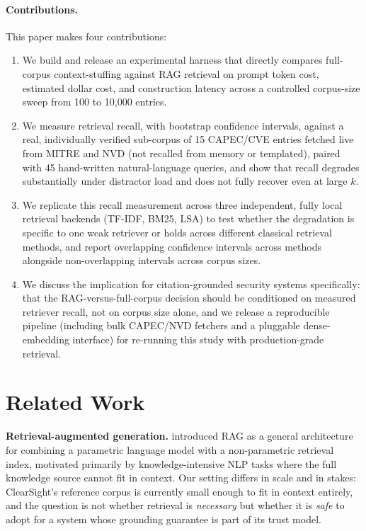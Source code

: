 \documentclass[11pt]{article}
\begin{document}
\paragraph{Contributions.} This paper makes four contributions:
\begin{enumerate}
    \item We build and release an experimental harness that directly compares full-corpus context-stuffing against RAG retrieval on prompt token cost, estimated dollar cost, and construction latency across a controlled corpus-size sweep from 100 to 10{,}000 entries.
    \item We measure retrieval recall, with bootstrap confidence intervals, against a real, individually verified sub-corpus of 15 CAPEC/CVE entries fetched live from MITRE and NVD (not recalled from memory or templated), paired with 45 hand-written natural-language queries, and show that recall degrades substantially under distractor load and does not fully recover even at large $k$.
    \item We replicate this recall measurement across three independent, fully local retrieval backends (TF-IDF, BM25, LSA) to test whether the degradation is specific to one weak retriever or holds across different classical retrieval methods, and report overlapping confidence intervals across methods alongside non-overlapping intervals across corpus sizes.
    \item We discuss the implication for citation-grounded security systems specifically: that the RAG-versus-full-corpus decision should be conditioned on measured retriever recall, not on corpus size alone, and we release a reproducible pipeline (including bulk CAPEC/NVD fetchers and a pluggable dense-embedding interface) for re-running this study with production-grade retrieval.
\end{enumerate}

\section{Related Work}

\textbf{Retrieval-augmented generation.} \citet{lewis2020rag} introduced RAG as a general architecture for combining a parametric language model with a non-parametric retrieval index, motivated primarily by knowledge-intensive NLP tasks where the full knowledge source cannot fit in context. Our setting differs in scale and in stakes: ClearSight's reference corpus is currently small enough to fit in context entirely, and the question is not whether retrieval is \emph{necessary} but whether it is \emph{safe} to adopt for a system whose grounding guarantee is part of its trust model.
\end{document}

